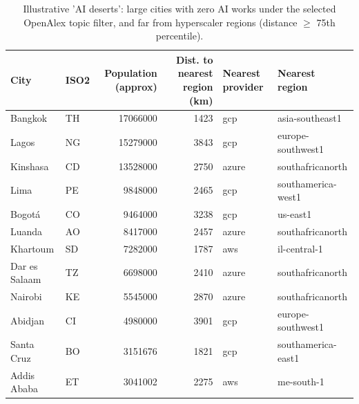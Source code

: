 \begin{table}[ht]
\centering
\begin{tabular}{llrrll}
\toprule
City & ISO2 & Population (approx) & Dist. to nearest region (km) & Nearest provider & Nearest region \\
\midrule
Bangkok & TH & 17066000 & 1423 & gcp & asia-southeast1 \\
Lagos & NG & 15279000 & 3843 & gcp & europe-southwest1 \\
Kinshasa & CD & 13528000 & 2750 & azure & southafricanorth \\
Lima & PE & 9848000 & 2465 & gcp & southamerica-west1 \\
Bogotá & CO & 9464000 & 3238 & gcp & us-east1 \\
Luanda & AO & 8417000 & 2457 & azure & southafricanorth \\
Khartoum & SD & 7282000 & 1787 & aws & il-central-1 \\
Dar es Salaam & TZ & 6698000 & 2410 & azure & southafricanorth \\
Nairobi & KE & 5545000 & 2870 & azure & southafricanorth \\
Abidjan & CI & 4980000 & 3901 & gcp & europe-southwest1 \\
Santa Cruz & BO & 3151676 & 1821 & gcp & southamerica-east1 \\
Addis Ababa & ET & 3041002 & 2275 & aws & me-south-1 \\
\bottomrule
\end{tabular}
\caption{Illustrative 'AI deserts': large cities with zero AI works under the selected OpenAlex topic filter, and far from hyperscaler regions (distance $\geq$ 75th percentile).}
\label{tab:underserved}
\end{table}
